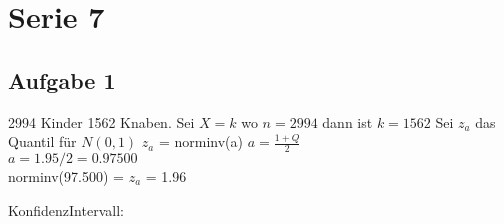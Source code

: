 \documentclass[a4paper,10pt]{scrbook}
\begin{document}
\chapter*{Serie 7}
\section*{Aufgabe 1}
2994 Kinder 1562 Knaben.
Sei $X=k$ wo $n = 2994$ dann ist $k =1562$
Sei $z_a$ das Quantil für $N(0,1)$ $z_a$ = norminv(a) $ a = \frac{1 + Q}{2}$ \\
$ a = 1.95/2 = 0.97500$ \\
norminv(97.500) = $z_a$ = 1.96\\
\begin{framed}
KonfidenzIntervall:\\
 \begin{equation}
  [\frac{k}{n} - \frac{z_a}{n} \sqrt{\frac{k(n-k)}{n}},\frac{k}{n}+\frac{z_a}{n} \sqrt{\frac{k(n-k)}{n}},]
 \end{equation}

\end{framed}
\end{document}
